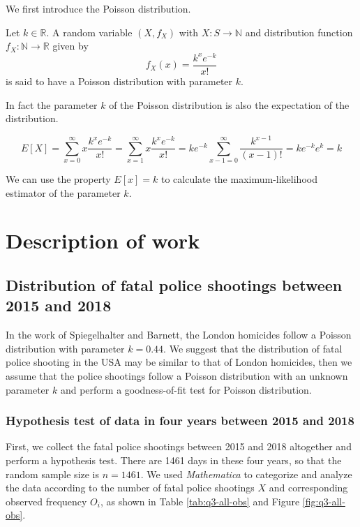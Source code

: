 \documentclass[conf]{new-aiaa}
\begin{document}
We first introduce the Poisson distribution\cite{horst}.

Let $k\in \mathbb{R}$. A random variable $(X,f_{X})$ with $X:S\rightarrow \mathbb{N}$ and distribution function $f_{X}:\mathbb{N}\rightarrow\mathbb{R}$ given by
\begin{equation}
f_{X}(x)=\frac{k^xe^{-k}}{x!}
\end{equation}
is said to have a Poisson distribution with parameter $k$.\medskip

In fact the parameter $k$ of the Poisson distribution is also the expectation of the distribution.

\begin{equation}
E[X]=\sum_{x=0}^{\infty}x\frac{k^xe^{-k}}{x!}=\sum_{x=1}^{\infty}x\frac{k^xe^{-k}}{x!}=ke^{-k}\sum_{x-1=0}^{\infty}\frac{k^{x-1}}{(x-1)!}=ke^{-k}e^k=k
\end{equation}

We can use the property $E[x]=k$ to calculate the maximum-likelihood estimator of the parameter $k$.
\newpage

\section{Description of work}

\subsection{Distribution of fatal police shootings between 2015 and 2018}\label{title:q3}

In the work of Spiegelhalter and Barnett\cite{london}, the London homicides follow a Poisson distribution with parameter $k = 0.44$. We suggest that the distribution of fatal police shooting in the USA may be similar to that of London homicides, then we assume that the police shootings follow a Poisson distribution with an unknown parameter $k$ and perform a goodness-of-fit test for Poisson distribution.

\subsubsection{Hypothesis test of data in four years between 2015 and 2018}\label{title:q3-1}

First, we collect the fatal police shootings between 2015 and 2018 altogether and perform a hypothesis test. There are 1461 days in these four years, so that the random sample size is $n=1461$. We used \emph{Mathematica} to categorize and analyze the data according to the number of fatal police shootings $X$ and corresponding observed frequency $O_i$, as shown in Table \ref{tab:q3-all-obs} and Figure \ref{fig:q3-all-obs}. \medskip
\end{document}
